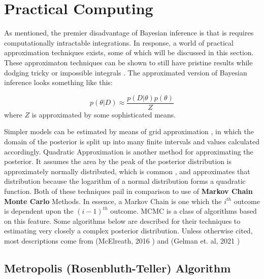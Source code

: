 \section{Practical Computing} %

 As mentioned, the premier disadvantage of Bayesian inference is that is requires computationally intractable integrations.  In response, a world of practical approximation techniques exists, some of which will be discussed in this section.  These approximaton techniques can be shown to still have pristine results while dodging tricky or impossible integrals \cite{tipping2004bayesian}.
 The approximated version of Bayesian inference looks something like this:

$$
p(\theta|D) \approx \frac{p(D|\theta)p(\theta)}{Z}
$$
where $Z$ is approximated by some sophisticated means.


Simpler models can be estimated by means of grid approximation \cite{mcelreath2016statistical}, in which the domain of the posterior is split up into many finite intervals and values calculated accordingly.  Quadratic Approximation is another method for approximating the posterior.  It assumes the area by the peak of the posterior distribution is approximately normally distributed, which is common \cite{mcelreath2016statistical}, and approximates that distribution because the logarithm of a normal distribution forms a quadratic function.  Both of these techniques pail in comparison to use of \textbf{Markov Chain Monte Carlo} Methods.  In essence, a Markov Chain is one which the $i^{th}$ outcome is dependent upon the $(i-1)^{th}$ outcome.  MCMC is a class of algorithms based on this feature.  Some algorithms below are described for their techniques to estimating very closely a complex posterior distribution.  Unless otherwise cited, most descriptions come from (McElreath, 2016 \cite{mcelreath2016statistical}) and (Gelman et. al, 2021 \cite{gelmanbayesian3}) 



\subsection{Metropolis (Rosenbluth-Teller) Algorithm}

